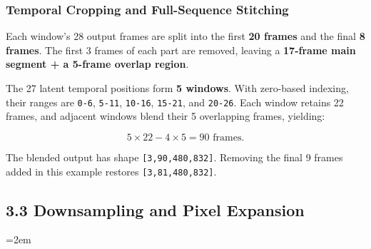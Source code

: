 \documentclass[
  11pt,
  a4paper,
]{article}
\newcommand{\NotesTableStyle}{\linespread{1}\fontsize{9.5pt}{13pt}\selectfont\setlength{\tabcolsep}{4pt}\renewcommand{\arraystretch}{1.1}\setlength{\extrarowheight}{5pt}\setlength{\LTpre}{5pt}\setlength{\LTpost}{6pt}\setlength{\parskip}{0pt}\emergencystretch=2em}
\begin{document}

\subsubsection{Temporal Cropping and Full-Sequence
Stitching}\label{h3-time-stitch}

Each window's 28 output frames are split into the first \textbf{20
frames} and the final \textbf{8 frames}. The first 3 frames of each part
are removed, leaving a \textbf{17-frame main segment + a 5-frame overlap
region}.

The 27 latent temporal positions form \textbf{5 windows}. With
zero-based indexing, their ranges are \texttt{0-6}, \texttt{5-11},
\texttt{10-16}, \texttt{15-21}, and \texttt{20-26}. Each window retains
22 frames, and adjacent windows blend their 5 overlapping frames,
yielding:

\[
5\times22-4\times5=90\text{ frames}.
\]

The blended output has shape \texttt{{[}3,90,480,832{]}}. Removing the
final 9 frames added in this example restores
\texttt{{[}3,81,480,832{]}}.


\subsection{3.3 Downsampling and Pixel Expansion}\label{h3-operations}

\begingroup\NotesTableStyle\fontsize{10pt}{12pt}\selectfont\renewcommand{\arraystretch}{1.02}\setlength{\extrarowheight}{1pt}
\end{document}
